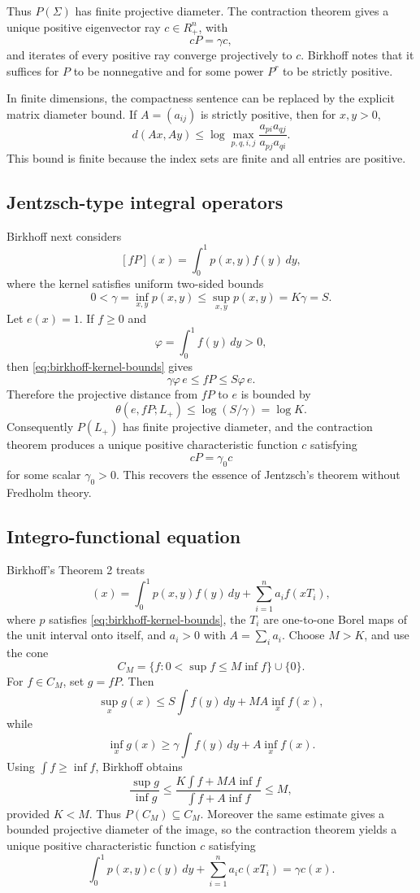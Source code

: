 \documentclass[11pt]{article}
\begin{document}
Thus \(P(\Sigma)\) has finite projective diameter.  The contraction theorem gives a unique positive eigenvector ray \(c\in R_+^n\), with
\[
  cP=\gamma c,
\]
and iterates of every positive ray converge projectively to \(c\).  Birkhoff notes that it suffices for \(P\) to be nonnegative and for some power \(P^r\) to be strictly positive.

In finite dimensions, the compactness sentence can be replaced by the explicit matrix diameter bound.  If \(A=(a_{ij})\) is strictly positive, then for \(x,y>0\),
\[
  d(Ax,Ay)\le \log\max_{p,q,i,j}\frac{a_{pi}a_{qj}}{a_{pj}a_{qi}}.
\]
This bound is finite because the index sets are finite and all entries are positive.

\subsection{Jentzsch-type integral operators}
Birkhoff next considers
\[
  [fP](x)=\int_0^1 p(x,y)f(y)\,dy,
\]
where the kernel satisfies uniform two-sided bounds
\begin{equation}
  0<\gamma=\inf_{x,y}p(x,y)\le \sup_{x,y}p(x,y)=K\gamma=S.
  \label{eq:birkhoff-kernel-bounds}
\end{equation}
Let \(e(x)=1\).  If \(f\ge0\) and
\[
  \varphi=\int_0^1 f(y)\,dy>0,
\]
then \eqref{eq:birkhoff-kernel-bounds} gives
\[
  \gamma\varphi\,e\le fP\le S\varphi\,e.
\]
Therefore the projective distance from \(fP\) to \(e\) is bounded by
\[
  \theta(e,fP;L_+)\le \log(S/\gamma)=\log K.
\]
Consequently \(P(L_+)\) has finite projective diameter, and the contraction theorem produces a unique positive characteristic function \(c\) satisfying
\[
  cP=\gamma_0 c
\]
for some scalar \(\gamma_0>0\).  This recovers the essence of Jentzsch's theorem without Fredholm theory.

\subsection{Integro-functional equation}
Birkhoff's Theorem 2 treats
\begin{equation}
  [fP](x)=\int_0^1 p(x,y)f(y)\,dy+
          \sum_{i=1}^n a_i f(xT_i),
  \label{eq:integro-functional}
\end{equation}
where \(p\) satisfies \eqref{eq:birkhoff-kernel-bounds}, the \(T_i\) are one-to-one Borel maps of the unit interval onto itself, and \(a_i>0\) with \(A=\sum_i a_i\).  Choose \(M>K\), and use the cone
\[
  C_M=\{f:0<\sup f\le M\inf f\}\cup\{0\}.
\]
For \(f\in C_M\), set \(g=fP\).  Then
\[
  \sup_x g(x)
  \le S\int f(y)\,dy+MA\inf_x f(x),
\]
while
\[
  \inf_x g(x)
  \ge \gamma\int f(y)\,dy+A\inf_x f(x).
\]
Using \(\int f\ge \inf f\), Birkhoff obtains
\begin{equation}
  \frac{\sup g}{\inf g}
  \le \frac{K\int f+MA\inf f}{\int f+A\inf f}
  \le M,
  \label{eq:integro-functional-cone-invariance}
\end{equation}
provided \(K<M\).  Thus \(P(C_M)\subseteq C_M\).  Moreover the same estimate gives a bounded projective diameter of the image, so the contraction theorem yields a unique positive characteristic function \(c\) satisfying
\[
  \int_0^1 p(x,y)c(y)\,dy+
  \sum_{i=1}^n a_i c(xT_i)=\gamma c(x).
\]
\end{document}
